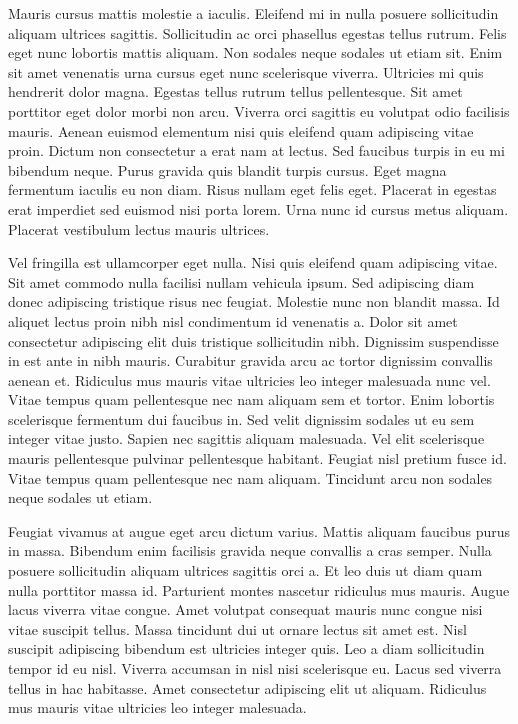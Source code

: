 Mauris cursus mattis molestie a iaculis. Eleifend mi in nulla posuere
 sollicitudin aliquam ultrices sagittis. Sollicitudin ac orci phasellus 
egestas tellus rutrum. Felis eget nunc lobortis mattis aliquam. Non 
sodales neque sodales ut etiam sit. Enim sit amet venenatis urna cursus 
eget nunc scelerisque viverra. Ultricies mi quis hendrerit dolor magna. 
Egestas tellus rutrum tellus pellentesque. Sit amet porttitor eget dolor
 morbi non arcu. Viverra orci sagittis eu volutpat odio facilisis 
mauris. Aenean euismod elementum nisi quis eleifend quam adipiscing 
vitae proin. Dictum non consectetur a erat nam at lectus. Sed faucibus 
turpis in eu mi bibendum neque. Purus gravida quis blandit turpis 
cursus. Eget magna fermentum iaculis eu non diam. Risus nullam eget 
felis eget. Placerat in egestas erat imperdiet sed euismod nisi porta 
lorem. Urna nunc id cursus metus aliquam. Placerat vestibulum lectus 
mauris ultrices.


Vel fringilla est ullamcorper eget nulla. Nisi quis eleifend quam 
adipiscing vitae. Sit amet commodo nulla facilisi nullam vehicula ipsum.
 Sed adipiscing diam donec adipiscing tristique risus nec feugiat. 
Molestie nunc non blandit massa. Id aliquet lectus proin nibh nisl 
condimentum id venenatis a. Dolor sit amet consectetur adipiscing elit 
duis tristique sollicitudin nibh. Dignissim suspendisse in est ante in 
nibh mauris. Curabitur gravida arcu ac tortor dignissim convallis aenean
 et. Ridiculus mus mauris vitae ultricies leo integer malesuada nunc 
vel. Vitae tempus quam pellentesque nec nam aliquam sem et tortor. Enim 
lobortis scelerisque fermentum dui faucibus in. Sed velit dignissim 
sodales ut eu sem integer vitae justo. Sapien nec sagittis aliquam 
malesuada. Vel elit scelerisque mauris pellentesque pulvinar 
pellentesque habitant. Feugiat nisl pretium fusce id. Vitae tempus quam 
pellentesque nec nam aliquam. Tincidunt arcu non sodales neque sodales 
ut etiam.


Feugiat vivamus at augue eget arcu dictum varius. Mattis aliquam 
faucibus purus in massa. Bibendum enim facilisis gravida neque convallis
 a cras semper. Nulla posuere sollicitudin aliquam ultrices sagittis 
orci a. Et leo duis ut diam quam nulla porttitor massa id. Parturient 
montes nascetur ridiculus mus mauris. Augue lacus viverra vitae congue. 
Amet volutpat consequat mauris nunc congue nisi vitae suscipit tellus. 
Massa tincidunt dui ut ornare lectus sit amet est. Nisl suscipit 
adipiscing bibendum est ultricies integer quis. Leo a diam sollicitudin 
tempor id eu nisl. Viverra accumsan in nisl nisi scelerisque eu. Lacus 
sed viverra tellus in hac habitasse. Amet consectetur adipiscing elit ut
 aliquam. Ridiculus mus mauris vitae ultricies leo integer malesuada.



